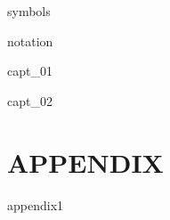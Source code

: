 \documentclass[oneside,english]{book}
\theoremstyle{plain}
\theoremstyle{definition}
\theoremstyle{definition}
\theoremstyle{plain}
\theoremstyle{myExamStyle}
\theoremstyle{myDefinitionStyle}
\theoremstyle{named}
\begin{document}
\markboth{}{}

{symbols}

{notation}

\mainmatter 
\setcounter{page}{1} \pagestyle{plain} 

{capt_01}

{capt_02}

\part*{APPENDIX}


\appendix
{appendix1}




\end{document}
